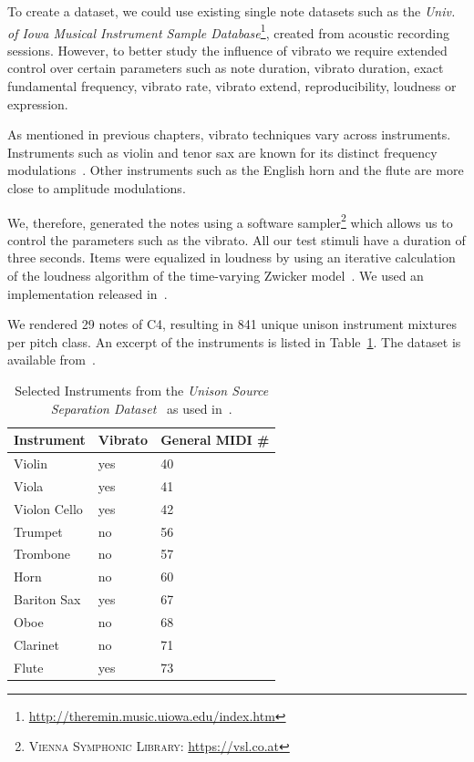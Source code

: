 \par
To create a dataset, we could use existing single note datasets such as the \emph{Univ. of Iowa Musical Instrument Sample Database}\footnote{\url{http://theremin.music.uiowa.edu/index.htm}}, created from acoustic recording sessions.
However, to better study the influence of vibrato we require extended control over certain parameters such as note duration, vibrato duration, exact fundamental frequency, vibrato rate, vibrato extend, reproducibility, loudness or expression.
\par
As mentioned in previous chapters, vibrato techniques vary across instruments. Instruments such as violin and tenor sax are known for its distinct frequency modulations~\cite{gilbert05}.
Other instruments such as the English horn and the flute are more close to amplitude modulations.
\par
We, therefore, generated the notes using a software sampler\footnote{\textsc{Vienna Symphonic Library}: \url{https://vsl.co.at}} which allows us to control the parameters such as the vibrato.
All our test stimuli have a duration of three seconds.
Items were equalized in loudness by using an iterative calculation of the loudness algorithm of the time-varying Zwicker model~\cite{zwicker13}. 
We used an implementation released in~\cite{genesis12}. 
\par
We rendered 29 notes of C4, resulting in 841 unique unison instrument mixtures per pitch class.
An excerpt of the instruments is listed in Table~\ref{tab:testset}.
The dataset is available from~\cite{oss_unison}.

\begin{table}
\begin{center}
\footnotesize
\begin{tabular}{ l l l}
  Instrument & Vibrato &  General MIDI \# \\
  \hline
  Violin & yes & 40 \\
  Viola & yes & 41 \\
  Violon Cello & yes & 42 \\
  Trumpet & no & 56 \\
  Trombone & no & 57\\
  Horn & no & 60  \\
  Bariton Sax & yes & 67 \\
  Oboe & no & 68\\
  Clarinet & no & 71\\
  Flute & yes & 73\\
\end{tabular}
\end{center}
\caption{Selected Instruments from the \emph{Unison Source Separation Dataset}~\cite{oss_unison} as used in~\cite{stoeter14, stoeter16}.}
\label{tab:testset}
\end{table}

